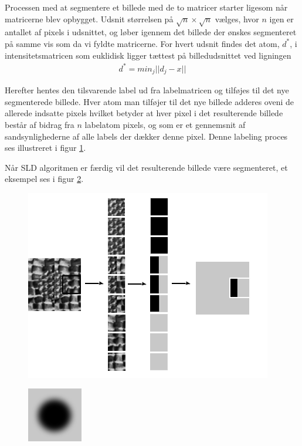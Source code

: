 Processen med at segmentere et billede med de to matricer starter ligesom når matricerne blev opbygget. Udsnit størrelsen på $\sqrt{n}\times\sqrt{n}$ vælges, hvor $n$ igen er antallet af pixels i udsnittet, og løber igennem det billede der ønskes segmenteret på samme vis som da vi fyldte matricerne. For hvert udsnit findes det atom, $d^*$, i intensitetsmatricen som euklidisk ligger tættest på billedudsnittet ved ligningen
\begin{align}
	d^* = min_j ||d_j-x||
\end{align}

Herefter hentes den tilsvarende label ud fra labelmatricen og tilføjes til det nye segmenterede billede. Hver atom man tilføjer til det nye billede adderes oveni de allerede indsatte pixels hvilket betyder at hver pixel i det resulterende billede består af bidrag fra $n$ labelatom pixels, og som er et gennemsnit af sandsynlighederne af alle labels der dækker denne pixel. Denne labeling proces ses illustreret i figur \ref{fig:postmethod_sld_labelpatch}.  

Når SLD algoritmen er færdig vil det resulterende billede være segmenteret, et eksempel ses i figur \ref{fig:postmethod_sld_resulting}.

\begin{figure}[H]
		\centering
		\includegraphics[scale=0.8]{files/postmethod/img/dict_new2.png}
	\caption{\label{fig:postmethod_sld_labelpatch}}
\end{figure}

\begin{figure}[H]
		\centering
		\includegraphics[scale=1]{files/postmethod/img/dict_new3.png}
	\caption{\label{fig:postmethod_sld_resulting}}
\end{figure}

